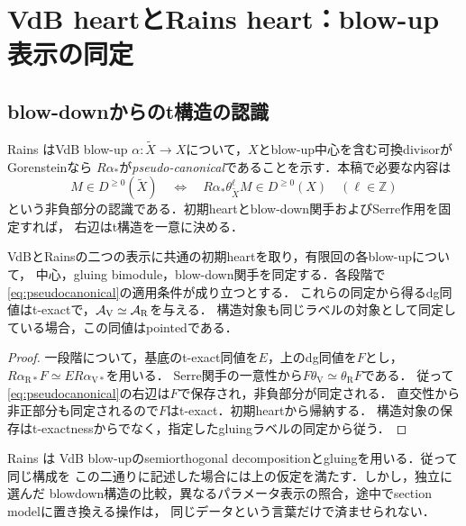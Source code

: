 \section{VdB heartとRains heart：blow-up表示の同定}\label{sec:VdBRains}
\subsection{blow-downからのt構造の認識}
Rains \cite[Lemma 4.9, Proposition 4.17]{Rains}はVdB blow-up
$\alpha:\widetilde X\to X$について，$X$とblow-up中心を含む可換divisorがGorensteinなら
$R\alpha_*$が\emph{pseudo-canonical}であることを示す．本稿で必要な内容は
\begin{equation}\label{eq:pseudocanonical}
M\in D^{\ge0}(\widetilde X)
\quad\Longleftrightarrow\quad
R\alpha_*\theta_{\widetilde X}^{\ell}M\in D^{\ge0}(X)
\quad(\ell\in\mathbb Z)
\end{equation}
という非負部分の認識である．初期heartとblow-down関手およびSerre作用を固定すれば，
右辺はt構造を一意に決める．

\begin{theorem}\label{thm:RV}
VdBとRainsの二つの表示に共通の初期heartを取り，有限回の各blow-upについて，
中心，gluing bimodule，blow-down関手を同定する．各段階で
\eqref{eq:pseudocanonical}の適用条件が成り立つとする．
これらの同定から得るdg同値はt-exactで，$\mathcal A_{\mathrm V}\simeq\mathcal A_{\mathrm R}$を与える．
構造対象も同じラベルの対象として同定している場合，この同値はpointedである．
\end{theorem}
\begin{proof}
一段階について，基底のt-exact同値を$E$，上のdg同値を$F$とし，
$R\alpha_{\mathrm R*}F\simeq E R\alpha_{\mathrm V*}$を用いる．
Serre関手の一意性から$F\theta_{\mathrm V}\simeq\theta_{\mathrm R}F$である．
従って\eqref{eq:pseudocanonical}の右辺は$F$で保存され，非負部分が同定される．
直交性から非正部分も同定されるので$F$はt-exact．初期heartから帰納する．
構造対象の保存はt-exactnessからでなく，指定したgluingラベルの同定から従う．
\end{proof}
\begin{remark}
Rains \cite[Theorem 4.10, Proposition 4.13, Theorem 4.30]{Rains}は
VdB blow-upのsemiorthogonal decompositionとgluingを用いる．従って同じ構成を
この二通りに記述した場合には上の仮定を満たす．しかし，独立に選んだ
blowdown構造の比較，異なるパラメータ表示の照合，途中でsection modelに置き換える操作は，
同じデータという言葉だけで済ませられない．
\end{remark}


